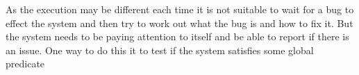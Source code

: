 As the execution may be different each time it is not suitable to wait for a bug to effect the system and then try to work out what the bug is and how to fix it. But the system needs to be paying attention to itself and be able to report if there is an issue. One way to do this it to test if the system satisfies some global predicate \cite{553309,345131,277788}



\begin{comment}
\cite{1382572, 749477, ?}. However, in distributed systems there are additional challenges to overcome \cite{5010224}

What can be meant by `detecting bugs', in non-distributed systems there are many different classes of bugs \cite{?}, when we consider distributed systems many of those bugs have new vectors in which they can arise. For example deadlock can now occur across motes if both motes are waiting on receiving a message the other mote should be sending. The fact that these systems are distributed means that debugging these kind of problems becomes harder \cite{?}. Also there are new ways bugs can arise, for example in the routing of information, if a message being sent is stuck being transmitted in a cycle of nodes it will never reach its destination. This type of problem requires lots of resources (either memory or large messages) to be able to effectively debug \cite{?}.
\end{comment}



